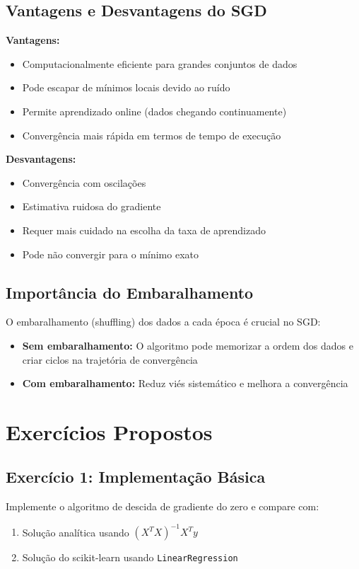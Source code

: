 \documentclass[a4paper,12pt]{article}
\begin{document}
\subsection{Vantagens e Desvantagens do SGD}

\textbf{Vantagens:}
\begin{itemize}
    \item Computacionalmente eficiente para grandes conjuntos de dados
    \item Pode escapar de mínimos locais devido ao ruído
    \item Permite aprendizado online (dados chegando continuamente)
    \item Convergência mais rápida em termos de tempo de execução
\end{itemize}

\textbf{Desvantagens:}
\begin{itemize}
    \item Convergência com oscilações
    \item Estimativa ruidosa do gradiente
    \item Requer mais cuidado na escolha da taxa de aprendizado
    \item Pode não convergir para o mínimo exato
\end{itemize}

\subsection{Importância do Embaralhamento}

O embaralhamento (shuffling) dos dados a cada época é crucial no SGD:

\begin{itemize}
    \item \textbf{Sem embaralhamento:} O algoritmo pode memorizar a ordem dos dados e criar ciclos na trajetória de convergência
    \item \textbf{Com embaralhamento:} Reduz viés sistemático e melhora a convergência
\end{itemize}

\section{Exercícios Propostos}

\subsection{Exercício 1: Implementação Básica}
Implemente o algoritmo de descida de gradiente do zero e compare com:
\begin{enumerate}
    \item Solução analítica usando $(X^TX)^{-1}X^Ty$
    \item Solução do scikit-learn usando \texttt{LinearRegression}
\end{enumerate}
\end{document}
